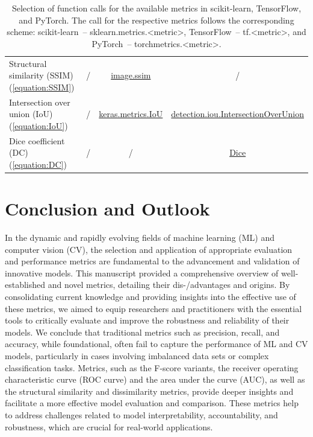 \documentclass{article}
\begin{document}
\begin{table}[H]
{\begin{tabular}{|l|c|c|c|}
        Structural similarity (SSIM) (\ref{equation:SSIM})
        &
        /
        &
        \href{https://www.tensorflow.org/api_docs/python/tf/image/ssim}{image.ssim}
        &
        /
        \\

        Intersection over union (IoU) (\ref{equation:IoU})
        &
        /
        &
        \href{https://www.tensorflow.org/api_docs/python/tf/keras/metrics/IoU}{keras.metrics.IoU}
        &
        \href{https://torchmetrics.readthedocs.io/en/latest/detection/intersection_over_union.html}{detection.iou.IntersectionOverUnion}
        \\

        Dice coefficient (DC) (\ref{equation:DC})
        &
        /
        &
        /
        &
        \href{https://torchmetrics.readthedocs.io/en/latest/classification/dice.html}{Dice}
        \\

        \hline
    \end{tabular}}

    \caption{Selection of function calls for the available metrics in scikit-learn, TensorFlow, and PyTorch. The call for the respective metrics follows the corresponding scheme: scikit-learn~-- sklearn.metrics.<metric>, TensorFlow~-- tf.<metric>, and PyTorch~-- torchmetrics.<metric>.}
    \label{table:CV_functions}
\end{table}




\clearpage




\section{Conclusion and Outlook}

In the dynamic and rapidly evolving fields of machine learning (ML) and computer vision (CV), the selection and application of appropriate evaluation and performance metrics are fundamental to the advancement and validation of innovative models. This manuscript provided a comprehensive overview of well-established and novel metrics, detailing their dis-/advantages and origins. By consolidating current knowledge and providing insights into the effective use of these metrics, we aimed to equip researchers and practitioners with the essential tools to critically evaluate and improve the robustness and reliability of their models. We conclude that traditional metrics such as precision, recall, and accuracy, while foundational, often fail to capture the performance of ML and CV models, particularly in cases involving imbalanced data sets or complex classification tasks. Metrics, such as the F-score variants, the receiver operating characteristic curve (ROC curve) and the area under the curve (AUC), as well as the structural similarity and dissimilarity metrics, provide deeper insights and facilitate a more effective model evaluation and comparison. These metrics help to address challenges related to model interpretability, accountability, and robustness, which are crucial for real-world applications.
\end{document}

